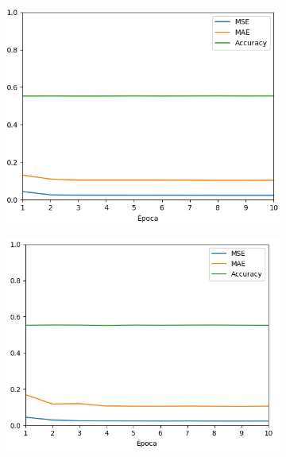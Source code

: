 \documentclass{cys}
\begin{document}
\begin{figure}[h]
\begin{subfigure}{0.32\textwidth}
		\includegraphics[width=\textwidth]{img/chauffeur3}
		\label{subfig:3}
	\end{subfigure}
	\begin{subfigure}{0.32\textwidth} 
		\includegraphics[width=\textwidth]{img/chauffeur5}
		\label{subfig:4}
	\end{subfigure}
	\begin{subfigure}{0.32\textwidth} 

\end{subfigure}
\end{figure}
\end{document}
